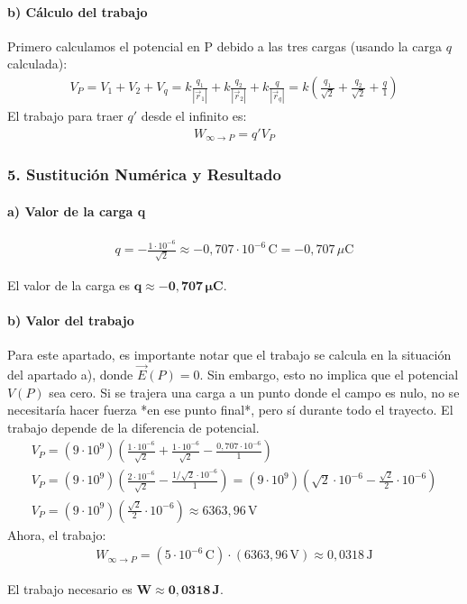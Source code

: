 \paragraph*{b) Cálculo del trabajo}
Primero calculamos el potencial en P debido a las tres cargas (usando la carga $q$ calculada):
\begin{gather}
    V_P = V_1 + V_2 + V_q = k\frac{q_1}{|\vec{r}_1|} + k\frac{q_2}{|\vec{r}_2|} + k\frac{q}{|\vec{r}_q|} = k\left(\frac{q_1}{\sqrt{2}} + \frac{q_2}{\sqrt{2}} + \frac{q}{1}\right)
\end{gather}
El trabajo para traer $q'$ desde el infinito es:
\begin{gather}
    W_{\infty \to P} = q' V_P
\end{gather}

\subsubsection*{5. Sustitución Numérica y Resultado}
\paragraph*{a) Valor de la carga q}
\begin{gather}
    q = -\frac{1 \cdot 10^{-6}}{\sqrt{2}} \approx -0,707 \cdot 10^{-6} \, \text{C} = -0,707 \, \mu\text{C}
\end{gather}
\begin{cajaresultado}
    El valor de la carga es $\boldsymbol{q \approx -0,707 \, \mu\textbf{C}}$.
\end{cajaresultado}

\paragraph*{b) Valor del trabajo}
Para este apartado, es importante notar que el trabajo se calcula en la situación del apartado a), donde $\vec{E}(P)=0$. Sin embargo, esto no implica que el potencial $V(P)$ sea cero. Si se trajera una carga a un punto donde el campo es nulo, no se necesitaría hacer fuerza *en ese punto final*, pero sí durante todo el trayecto. El trabajo depende de la diferencia de potencial.
\begin{gather}
    V_P = (9 \cdot 10^9) \left( \frac{1 \cdot 10^{-6}}{\sqrt{2}} + \frac{1 \cdot 10^{-6}}{\sqrt{2}} - \frac{0,707 \cdot 10^{-6}}{1} \right) \nonumber \\[8pt]
    V_P = (9 \cdot 10^9) \left( \frac{2 \cdot 10^{-6}}{\sqrt{2}} - \frac{1/\sqrt{2} \cdot 10^{-6}}{1} \right) = (9 \cdot 10^9) \left( \sqrt{2} \cdot 10^{-6} - \frac{\sqrt{2}}{2} \cdot 10^{-6} \right) \nonumber \\[8pt]
    V_P = (9 \cdot 10^9) \left( \frac{\sqrt{2}}{2} \cdot 10^{-6} \right) \approx 6363,96 \, \text{V}
\end{gather}
Ahora, el trabajo:
\begin{gather}
    W_{\infty \to P} = (5 \cdot 10^{-6} \, \text{C}) \cdot (6363,96 \, \text{V}) \approx 0,0318 \, \text{J}
\end{gather}
\begin{cajaresultado}
    El trabajo necesario es $\boldsymbol{W \approx 0,0318 \, \textbf{J}}$.
\end{cajaresultado}

